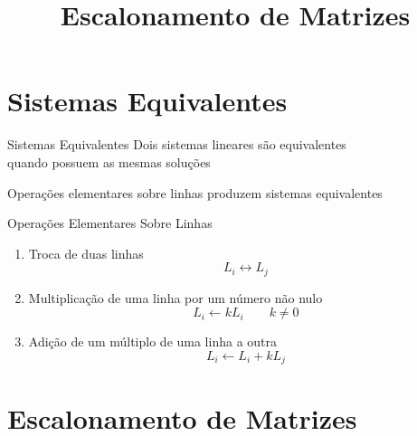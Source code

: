 \documentclass[fleqn,aspectratio=169,12pt]{beamer}
\title{Escalonamento de Matrizes}
\begin{document}
\addtitle

\section{Sistemas Equivalentes}

\begin{frame}{Sistemas Equivalentes}
  Dois sistemas lineares são equivalentes
  \\ \pause
  quando possuem as mesmas soluções

  \bigskip
  \pause
  Operações elementares sobre linhas produzem sistemas equivalentes
\end{frame}

\begin{frame}{Operações Elementares Sobre Linhas}
  \begin{enumerate}[<+->]
    \item Troca de duas linhas
    \[
      L_i \leftrightarrow L_j
    \]

    \item Multiplicação de uma linha por um número não nulo
    \[
      L_i \leftarrow k L_i
      \qquad k\neq0
    \]

    \item Adição de um múltiplo de uma linha a outra
    \[
      L_i \leftarrow L_i + k L_j
    \]
  \end{enumerate}
\end{frame}





\section{Escalonamento de Matrizes}
\end{document}
